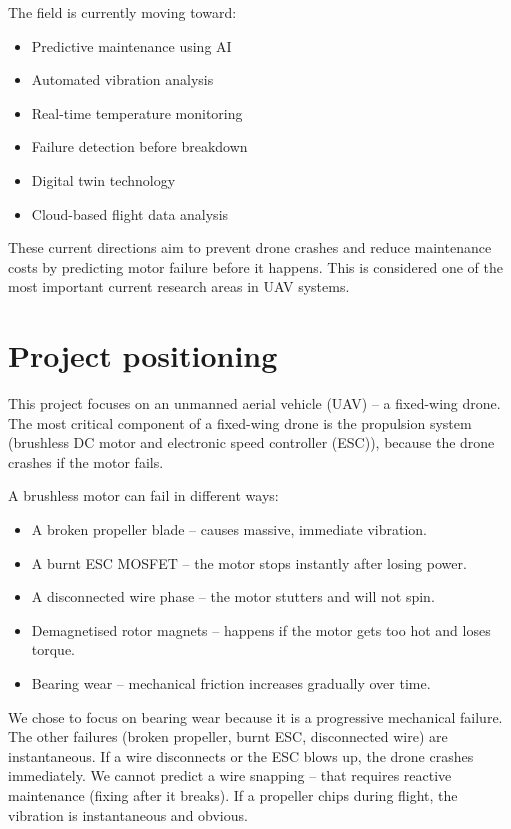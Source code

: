 The field is currently moving toward:
\begin{itemize}
    \item Predictive maintenance using AI
    \item Automated vibration analysis
    \item Real-time temperature monitoring
    \item Failure detection before breakdown
    \item Digital twin technology
    \item Cloud-based flight data analysis
\end{itemize}

These current directions aim to prevent drone crashes and reduce maintenance costs by predicting motor failure before it happens. This is considered one of the most important current research areas in UAV systems.

\section{Project positioning}

This project focuses on an unmanned aerial vehicle (UAV) – a fixed-wing drone. The most critical component of a fixed-wing drone is the propulsion system (brushless DC motor and electronic speed controller (ESC)), because the drone crashes if the motor fails.

A brushless motor can fail in different ways:
\begin{itemize}
    \item A broken propeller blade – causes massive, immediate vibration.
    \item A burnt ESC MOSFET – the motor stops instantly after losing power.
    \item A disconnected wire phase – the motor stutters and will not spin.
    \item Demagnetised rotor magnets – happens if the motor gets too hot and loses torque.
    \item Bearing wear – mechanical friction increases gradually over time.
\end{itemize}

We chose to focus on bearing wear because it is a progressive mechanical failure. The other failures (broken propeller, burnt ESC, disconnected wire) are instantaneous. If a wire disconnects or the ESC blows up, the drone crashes immediately. We cannot predict a wire snapping – that requires reactive maintenance (fixing after it breaks). If a propeller chips during flight, the vibration is instantaneous and obvious.

